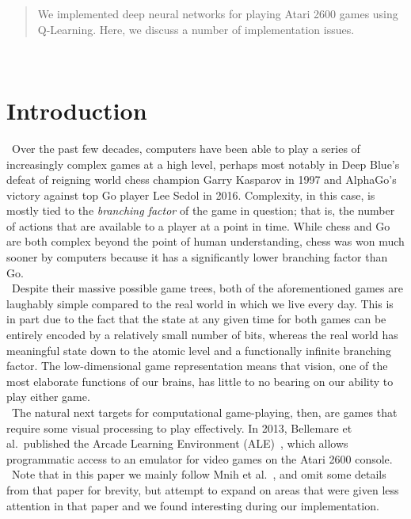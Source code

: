 \documentclass[conference]{IEEEtran}
\begin{document}
\begin{abstract}
    We implemented deep neural networks for playing Atari 2600 games using
    Q-Learning.  Here, we discuss a number of implementation issues.
\end{abstract}





%
\IEEEpeerreviewmaketitle\



\section{Introduction}
\noindent\ Over the past few decades, computers have been able to play a series
of increasingly complex games at a high level, perhaps most notably in Deep
Blue's defeat of reigning world chess champion Garry Kasparov in 1997 and
AlphaGo's victory against top Go player Lee Sedol in 2016. Complexity, in this
case, is mostly tied to the \emph{branching factor} of the game in question;
that is, the number of actions that are available to a player at a point in
time.  While chess and Go are both complex beyond the point of human
understanding, chess was won much sooner by computers because it has a
significantly lower branching factor than Go.\\
\indent\ Despite their massive possible game trees, both of the aforementioned
games are laughably simple compared to the real world in which we live every
day. This is in part due to the fact that the state at any given time for both
games can be entirely encoded by a relatively small number of bits, whereas the
real world has meaningful state down to the atomic level and a functionally
infinite branching factor.  The low-dimensional game representation means that
vision, one of the most elaborate functions of our brains, has little to no
bearing on our ability to play either game.\\
\indent\ The natural next targets for computational game-playing, then, are
games that require some visual processing to play effectively. In 2013,
Bellemare et al.\ published the Arcade Learning Environment
(ALE)~\cite{bellemare13arcade}, which allows programmatic access to an emulator
for video games on the Atari 2600 console.\\
\indent\ Note that in this paper we mainly follow Mnih et
al.~\cite{mnih2013playing}, and omit some details from that paper for brevity,
but attempt to expand on areas that were given less attention in that paper and
we found interesting during our implementation.
\end{document}
